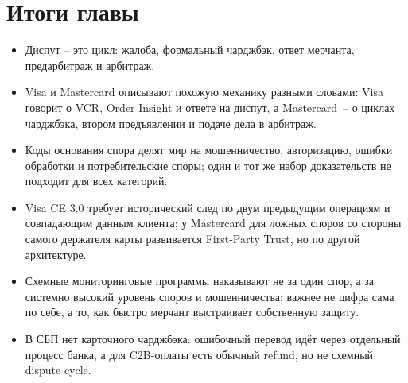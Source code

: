 \section*{Итоги главы}
\begin{itemize}
  \item Диспут -- это цикл: жалоба, формальный чарджбэк,
        ответ мерчанта, предарбитраж и арбитраж.
  \item Visa и Mastercard описывают похожую механику
        разными словами: Visa говорит о VCR, Order Insight и
        ответе на диспут, а Mastercard~-- о циклах чарджбэка,
        втором предъявлении и подаче дела в арбитраж.
  \item Коды основания спора делят мир на мошенничество, авторизацию,
        ошибки обработки и потребительские споры; один и тот же набор
        доказательств не
        подходит для всех категорий.
  \item Visa CE 3.0 требует исторический след по двум
        предыдущим операциям и совпадающим данным клиента; у
        Mastercard для ложных споров со стороны самого
        держателя карты развивается
        First-Party Trust, но по другой архитектуре.
  \item Схемные мониторинговые программы наказывают не за один спор, а
        за системно высокий уровень споров и мошенничества; важнее не
        цифра сама по себе, а то, как быстро мерчант выстраивает
        собственную защиту.
  \item В СБП нет карточного чарджбэка: ошибочный перевод идёт через
        отдельный процесс банка, а для C2B-оплаты есть обычный refund,
        но не схемный dispute cycle.
\end{itemize}
